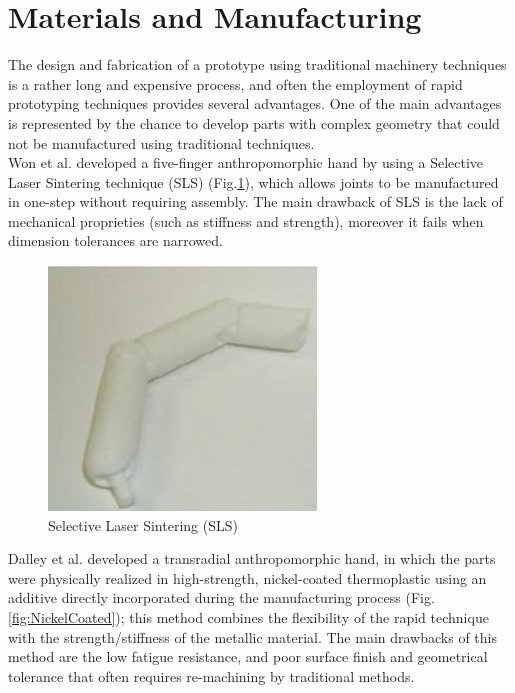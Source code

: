 \documentclass[a4paper, 10pt, conference]{ieeeconf}      %
\begin{document}
\section{\textbf{Materials and Manufacturing}}
The design and fabrication of a prototype using traditional machinery techniques is a rather long and expensive process, and often the employment of rapid prototyping techniques provides several advantages. One of the main advantages is represented by the chance to develop parts with complex geometry that could not be manufactured using traditional techniques.\\
Won et al. \cite{won2000fabrication} developed a five-finger anthropomorphic hand by using a Selective Laser Sintering technique (SLS) (Fig.\ref{fig:SelectiveLaserSintering}), which allows joints to be manufactured in one-step without requiring assembly. The main drawback of SLS is the lack of mechanical proprieties (such as stiffness and strength), moreover it fails when dimension tolerances are narrowed.\\
\begin{figure}[h!]
\centering  \includegraphics[scale=0.7]{./images/SelectiveLaserSintering}
  \caption{Selective Laser Sintering (SLS)}
  \label{fig:SelectiveLaserSintering}
	\end{figure}
Dalley et al. \cite{dalley2009design} developed a transradial anthropomorphic hand, in which the parts were physically realized in high-strength, nickel-coated thermoplastic using an additive directly incorporated during the manufacturing process (Fig.\ref{fig:NickelCoated}); this method combines the flexibility of the rapid technique with the strength/stiffness of the metallic material. The main drawbacks of this method are the low fatigue resistance, and poor surface finish and geometrical tolerance that often requires re-machining by traditional methods.\\
\end{document}
